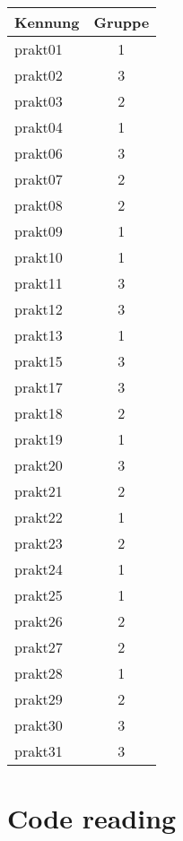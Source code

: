 \begin{center}

\begin{tabular}{|l|c|}
\hline
\bf Kennung   &  \bf Gruppe \\
\hline
prakt01       &      1      \\
prakt02       &      3      \\
prakt03       &      2      \\
prakt04       &      1      \\
prakt06       &      3      \\
\hline
prakt07       &      2      \\
prakt08       &      2      \\
prakt09       &      1      \\
prakt10       &      1      \\
prakt11       &      3      \\
\hline
prakt12       &      3      \\
prakt13       &      1      \\
prakt15       &      3      \\
prakt17       &      3      \\
prakt18       &      2      \\
\hline
prakt19       &      1      \\
prakt20       &      3      \\
prakt21       &      2      \\
prakt22       &      1      \\
prakt23       &      2      \\
\hline
prakt24       &      1      \\
prakt25       &      1      \\
prakt26       &      2      \\
prakt27       &      2      \\
prakt28       &      1      \\
\hline
prakt29       &      2      \\
prakt30       &      3      \\
prakt31       &      3      \\
\hline
\end{tabular}

\end{center}

\newpage
\section*{Code reading}

